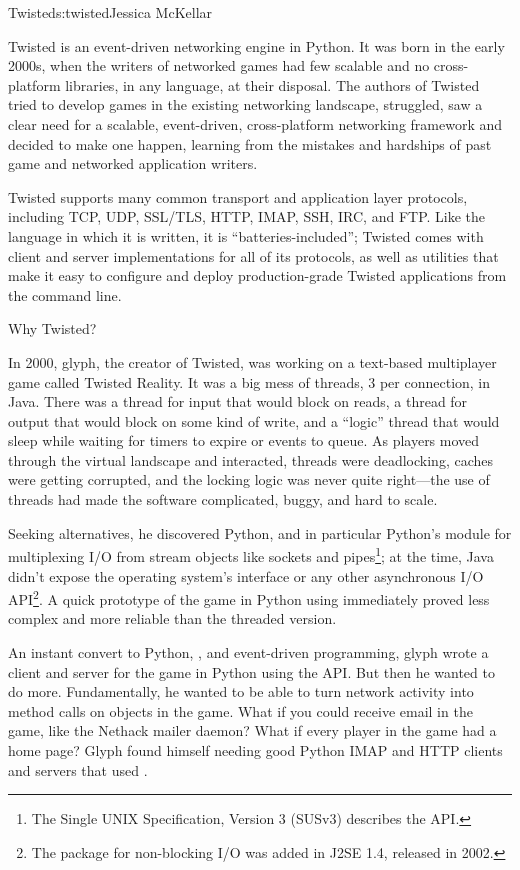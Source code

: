 \begin{aosachapter}{Twisted}{s:twisted}{Jessica McKellar}

Twisted is an event-driven networking engine in Python. It was born in the
early 2000s, when the writers of networked games had few scalable and no
cross-platform libraries, in any language, at their disposal. The authors of
Twisted tried to develop games in the existing networking landscape, struggled,
saw a clear need for a scalable, event-driven, cross-platform networking
framework and decided to make one happen, learning from the mistakes and
hardships of past game and networked application writers.

Twisted supports many common transport and application layer protocols,
including TCP, UDP, SSL/TLS, HTTP, IMAP, SSH, IRC, and FTP.  Like the language
in which it is written, it is ``batteries-included''; Twisted comes with client
and server implementations for all of its protocols, as well as utilities that
make it easy to configure and deploy production-grade Twisted applications from
the command line.

\begin{aosasect1}{Why Twisted?}

In 2000, glyph, the creator of Twisted, was working on a text-based
multiplayer game called Twisted Reality. It was a big mess of threads, 3 per
connection, in Java. There was a thread for input that would block on reads, a
thread for output that would block on some kind of write, and a ``logic'' thread
that would sleep while waiting for timers to expire or events to queue. As
players moved through the virtual landscape and interacted, threads were
deadlocking, caches were getting corrupted, and the locking logic was never
quite right---the use of threads had made the software complicated, buggy, and
hard to scale.

Seeking alternatives, he discovered Python, and in particular Python's
 module for multiplexing I/O from stream objects like
sockets and pipes\footnote{The Single UNIX Specification, Version 3
  (SUSv3) describes the  API.}; at the time, Java didn't
expose the operating system's  interface or any other
asynchronous I/O API\footnote{The  package for
  non-blocking I/O was added in J2SE 1.4, released in 2002.}. A quick
prototype of the game in Python using  immediately proved
less complex and more reliable than the threaded version.

An instant convert to Python, , and event-driven
programming, glyph wrote a client and server for the game in Python
using the  API. But then he wanted to do more. Fundamentally,
he wanted to be able to turn network activity into method calls on objects in
the game. What if you could receive email in the game, like the Nethack mailer
daemon? What if every player in the game had a home page? Glyph found himself
needing good Python IMAP and HTTP clients and servers that used
.


\end{aosasect1}
\end{aosachapter}
